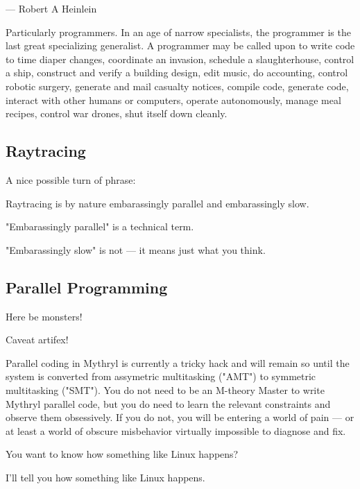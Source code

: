                    --- Robert A Heinlein 

Particularly programmers.  In an age of narrow specialists, 
the programmer is the last great specializing generalist.  A programmer 
may be called upon to write code to time diaper changes, coordinate 
an invasion, schedule a slaughterhouse, control a ship, construct and 
verify a building design, edit music, do accounting, control robotic 
surgery, generate and mail casualty notices, compile code, generate 
code, interact with other humans or computers, operate autonomously, 
manage meal recipes, control war drones, shut itself down cleanly. 



\subsection{Raytracing}

A nice possible turn of phrase:

    Raytracing is by nature embarassingly parallel  and embarassingly slow.

    "Embarassingly parallel" is a technical term.

    "Embarassingly slow" is not --- it means just what you think. 

\subsection{Parallel Programming}

Here be monsters!

Caveat artifex! 

Parallel coding in Mythryl is currently a tricky hack and will remain so 
until the system is converted from assymetric multitasking ("AMT") to 
symmetric multitasking ("SMT").  You do not need to be an M-theory Master 
to write Mythryl parallel code, but you do need to learn the relevant 
constraints and observe them obsessively.  If you do not, you will be 
entering a world of pain --- or at least a world of obscure misbehavior 
virtually impossible to diagnose and fix. 





You want to know how something like Linux happens? 

I'll tell you how something like Linux happens. 

